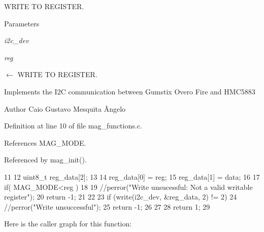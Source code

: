 WRITE TO REGISTER. 


\begin{DoxyParams}{Parameters}
\item[{\em i2c\_\-dev}]\item[{\em reg}]\item[\mbox{$\leftarrow$} {\em }]WRITE TO REGISTER.\end{DoxyParams}
Implements the I2C communication between Gumstix Overo Fire and HMC5883 \begin{DoxyAuthor}{Author}
Caio Gustavo Mesquita Ângelo 
\end{DoxyAuthor}


Definition at line 10 of file mag\_\-functions.c.



References MAG\_\-MODE.



Referenced by mag\_\-init().




\begin{DoxyCode}
11 {
12   uint8_t reg_data[2];
13 
14   reg_data[0] = reg;
15   reg_data[1] = data;
16 
17   if( MAG_MODE<reg )
18   {
19       //perror("Write unsucessful: Not a valid writable register");
20       return -1;
21   }
22         
23   if (write(i2c_dev, &reg_data, 2) != 2) {               
24           //perror("Write unsuccessful");
25           return -1;
26   }
27 
28   return 1;
29 }
\end{DoxyCode}




Here is the caller graph for this function:

